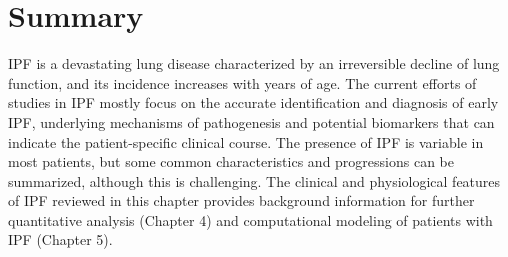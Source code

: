 \section{Summary}
IPF is a devastating lung disease characterized by an irreversible decline of lung function, and its incidence increases with years of age. The current efforts of studies in IPF mostly focus on the  accurate identification and diagnosis of early IPF, underlying mechanisms of pathogenesis and potential biomarkers that can indicate the patient-specific clinical course. The presence of IPF is variable in most patients, but some common characteristics and progressions can be summarized, although this is challenging. The clinical and physiological features of IPF reviewed in this chapter provides background information for further quantitative analysis (Chapter 4) and computational modeling of patients with IPF (Chapter 5). 
